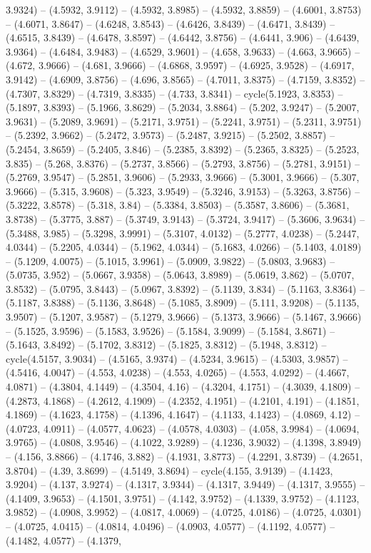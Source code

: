 3.9324) -- (4.5932, 3.9112) -- (4.5932, 3.8985) -- (4.5932, 3.8859) -- (4.6001, 3.8753) -- (4.6071, 3.8647) -- (4.6248, 3.8543) -- (4.6426, 3.8439) -- (4.6471, 3.8439) -- (4.6515, 3.8439) -- (4.6478, 3.8597) -- (4.6442, 3.8756) -- (4.6441, 3.906) -- (4.6439, 3.9364) -- (4.6484, 3.9483) -- (4.6529, 3.9601) -- (4.658, 3.9633) -- (4.663, 3.9665) -- (4.672, 3.9666) -- (4.681, 3.9666) -- (4.6868, 3.9597) -- (4.6925, 3.9528) -- (4.6917, 3.9142) -- (4.6909, 3.8756) -- (4.696, 3.8565) -- (4.7011, 3.8375) -- (4.7159, 3.8352) -- (4.7307, 3.8329) -- (4.7319, 3.8335) -- (4.733, 3.8341) -- cycle(5.1923, 3.8353) -- (5.1897, 3.8393) -- (5.1966, 3.8629) -- (5.2034, 3.8864) -- (5.202, 3.9247) -- (5.2007, 3.9631) -- (5.2089, 3.9691) -- (5.2171, 3.9751) -- (5.2241, 3.9751) -- (5.2311, 3.9751) -- (5.2392, 3.9662) -- (5.2472, 3.9573) -- (5.2487, 3.9215) -- (5.2502, 3.8857) -- (5.2454, 3.8659) -- (5.2405, 3.846) -- (5.2385, 3.8392) -- (5.2365, 3.8325) -- (5.2523, 3.835) -- (5.268, 3.8376) -- (5.2737, 3.8566) -- (5.2793, 3.8756) -- (5.2781, 3.9151) -- (5.2769, 3.9547) -- (5.2851, 3.9606) -- (5.2933, 3.9666) -- (5.3001, 3.9666) -- (5.307, 3.9666) -- (5.315, 3.9608) -- (5.323, 3.9549) -- (5.3246, 3.9153) -- (5.3263, 3.8756) -- (5.3222, 3.8578) -- (5.318, 3.84) -- (5.3384, 3.8503) -- (5.3587, 3.8606) -- (5.3681, 3.8738) -- (5.3775, 3.887) -- (5.3749, 3.9143) -- (5.3724, 3.9417) -- (5.3606, 3.9634) -- (5.3488, 3.985) -- (5.3298, 3.9991) -- (5.3107, 4.0132) -- (5.2777, 4.0238) -- (5.2447, 4.0344) -- (5.2205, 4.0344) -- (5.1962, 4.0344) -- (5.1683, 4.0266) -- (5.1403, 4.0189) -- (5.1209, 4.0075) -- (5.1015, 3.9961) -- (5.0909, 3.9822) -- (5.0803, 3.9683) -- (5.0735, 3.952) -- (5.0667, 3.9358) -- (5.0643, 3.8989) -- (5.0619, 3.862) -- (5.0707, 3.8532) -- (5.0795, 3.8443) -- (5.0967, 3.8392) -- (5.1139, 3.834) -- (5.1163, 3.8364) -- (5.1187, 3.8388) -- (5.1136, 3.8648) -- (5.1085, 3.8909) -- (5.111, 3.9208) -- (5.1135, 3.9507) -- (5.1207, 3.9587) -- (5.1279, 3.9666) -- (5.1373, 3.9666) -- (5.1467, 3.9666) -- (5.1525, 3.9596) -- (5.1583, 3.9526) -- (5.1584, 3.9099) -- (5.1584, 3.8671) -- (5.1643, 3.8492) -- (5.1702, 3.8312) -- (5.1825, 3.8312) -- (5.1948, 3.8312) -- cycle(4.5157, 3.9034) -- (4.5165, 3.9374) -- (4.5234, 3.9615) -- (4.5303, 3.9857) -- (4.5416, 4.0047) -- (4.553, 4.0238) -- (4.553, 4.0265) -- (4.553, 4.0292) -- (4.4667, 4.0871) -- (4.3804, 4.1449) -- (4.3504, 4.16) -- (4.3204, 4.1751) -- (4.3039, 4.1809) -- (4.2873, 4.1868) -- (4.2612, 4.1909) -- (4.2352, 4.1951) -- (4.2101, 4.191) -- (4.1851, 4.1869) -- (4.1623, 4.1758) -- (4.1396, 4.1647) -- (4.1133, 4.1423) -- (4.0869, 4.12) -- (4.0723, 4.0911) -- (4.0577, 4.0623) -- (4.0578, 4.0303) -- (4.058, 3.9984) -- (4.0694, 3.9765) -- (4.0808, 3.9546) -- (4.1022, 3.9289) -- (4.1236, 3.9032) -- (4.1398, 3.8949) -- (4.156, 3.8866) -- (4.1746, 3.882) -- (4.1931, 3.8773) -- (4.2291, 3.8739) -- (4.2651, 3.8704) -- (4.39, 3.8699) -- (4.5149, 3.8694) -- cycle(4.155, 3.9139) -- (4.1423, 3.9204) -- (4.137, 3.9274) -- (4.1317, 3.9344) -- (4.1317, 3.9449) -- (4.1317, 3.9555) -- (4.1409, 3.9653) -- (4.1501, 3.9751) -- (4.142, 3.9752) -- (4.1339, 3.9752) -- (4.1123, 3.9852) -- (4.0908, 3.9952) -- (4.0817, 4.0069) -- (4.0725, 4.0186) -- (4.0725, 4.0301) -- (4.0725, 4.0415) -- (4.0814, 4.0496) -- (4.0903, 4.0577) -- (4.1192, 4.0577) -- (4.1482, 4.0577) -- (4.1379, 
